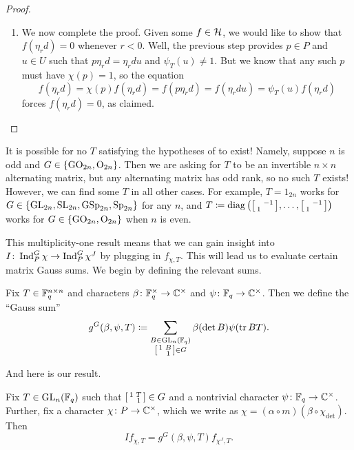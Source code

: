 \begin{proof}
\begin{enumerate}
		\item We now complete the proof. Given some $f\in\mathcal{H}$, we would like to show that $f(\eta_rd)=0$ whenever $r<0$. Well, the previous step provides $p\in P$ and $u\in U$ such that $p\eta_rd=\eta_rdu$ and $\psi_T(u)\ne1$. But we know that any such $p$ must have $\chi(p)=1$, so the equation
		\[f(\eta_rd)=\chi(p)f(\eta_rd)=f(p\eta_rd)=f(\eta_rdu)=\psi_T(u)f(\eta_rd)\]
		forces $f(\eta_rd)=0$, as claimed.
		\qedhere
	\end{enumerate}
\end{proof}
\begin{remark} \label{rem:bad-orthogonal}
	It is possible for no $T$ satisfying the hypotheses of  to exist! Namely, suppose $n$ is odd and $G\in\{\mathrm{GO}_{2n},\mathrm{O}_{2n}\}$. Then we are asking for $T$ to be an invertible $n\times n$ alternating matrix, but any alternating matrix has odd rank, so no such $T$ exists! However, we can find some $T$ in all other cases. For example, $T=1_{2n}$ works for $G\in\{\mathrm{GL}_{2n},\mathrm{SL}_{2n},\mathrm{GSp}_{2n},\mathrm{Sp}_{2n}\}$ for any $n$, and $T\coloneqq\operatorname{diag}\left(\begin{bsmallmatrix}
		& -1 \\ 1
	\end{bsmallmatrix},\ldots,\begin{bsmallmatrix}
		& -1 \\ 1
	\end{bsmallmatrix}\right)$ works for $G\in\{\mathrm{GO}_{2n},\mathrm{O}_{2n}\}$ when $n$ is even.
\end{remark}
This multiplicity-one result means that we can gain insight into $I\colon\operatorname{Ind}_P^G\chi\to\operatorname{Ind}_P^G\chi^J$ by plugging in $f_{\chi,T}$. This will lead us to evaluate certain matrix Gauss sums. We begin by defining the relevant sums.
\begin{definition}
	Fix $T\in \mathbb F_q^{n\times n}$ and characters $\beta\colon\mathbb F_q^\times\to\mathbb C^\times$ and $\psi\colon\mathbb F_q\to\mathbb C^\times$. Then we define the ``Gauss sum''
	\[g^G(\beta,\psi,T)\coloneqq\sum_{\substack{B\in\mathrm{GL}_n(\mathbb F_q)\\\begin{bsmallmatrix}
		1 & B \\ & 1
	\end{bsmallmatrix}\in G}}\beta(\det B)\psi(\operatorname{tr} BT).\]
\end{definition}
And here is our result.
\begin{proposition} \label{prop:i-on-psi-eigen}
	Fix $T\in\mathrm{GL}_n(\mathbb F_q)$ such that $\begin{bsmallmatrix}
		1 & T \\ & 1
	\end{bsmallmatrix}\in G$ and a nontrivial character $\psi\colon\mathbb F_q\to\mathbb C^\times$. Further, fix a character $\chi\colon P\to\mathbb C^\times$, which we write as $\chi=(\alpha\circ m)(\beta\circ\chi_{\det})$. Then
	\[If_{\chi,T}=g^G(\beta,\psi,T)f_{\chi^J,T}.\]
\end{proposition}
